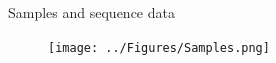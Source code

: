 \documentclass{beamer}
\begin{document}
\begin{frame}{Samples and sequence data}
    \begin{figure}
        \texttt{[image: ../Figures/Samples.png]}
    \end{figure}
\end{frame}
\end{document}
